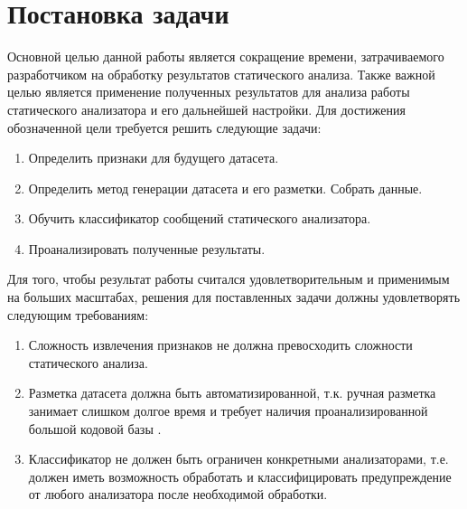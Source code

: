 \section{Постановка задачи}
\label{sec:Chapter1} 

Основной целью данной работы является сокращение времени, затрачиваемого разработчиком на обработку результатов статического анализа. Также важной целью является применение полученных результатов для анализа работы статического анализатора и его дальнейшей настройки. Для достижения обозначенной цели требуется решить следующие задачи:

\begin{enumerate}
    \item Определить признаки для будущего датасета.
    \item Определить метод генерации датасета и его разметки. Собрать данные.
    \item Обучить классификатор сообщений статического анализатора.
    \item Проанализировать полученные результаты.
\end{enumerate}

Для того, чтобы результат работы считался удовлетворительным и применимым на больших масштабах, решения для поставленных задачи должны удовлетворять следующим требованиям:

\begin{enumerate}
    \item Сложность извлечения признаков не должна превосходить сложности статического анализа.
    \item Разметка датасета должна быть автоматизированной, т.к. ручная разметка занимает слишком долгое время и требует наличия проанализированной большой кодовой базы \cite{Ayewah2010TheGF}.
    \item Классификатор не должен быть ограничен конкретными анализаторами, т.е. должен иметь возможность обработать и классифицировать предупреждение от любого анализатора после необходимой обработки.
\end{enumerate}

\newpage